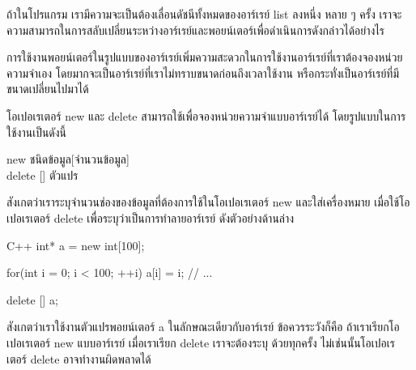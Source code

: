 \begin{quiz}{}
ถ้า{\wbr}ใน{\wbr}โปรแกรม เรา{\wbr}มี{\wbr}ความ{\wbr}จะ{\wbr}เป็น{\wbr}ต้อง{\wbr}เลื่อน{\wbr}ดัชนี{\wbr}ทั้งหมด{\wbr}ของ{\wbr}อาร์{\wbr}เรย์ {\ct list} ลง{\wbr}หนึ่ง{\wbr}
หลาย ๆ ครั้ง{\wbr}
เรา{\wbr}จะ{\wbr}ความ{\wbr}สามารถ{\wbr}ใน{\wbr}การ{\wbr}สลับ{\wbr}เปลี่ยน{\wbr}ระหว่าง{\wbr}อาร์{\wbr}เรย์{\wbr}และ{\wbr}พอยน์เตอร์{\wbr}เพื่อ{\wbr}ดำเนิน{\wbr}การ{\wbr}ดัง{\wbr}กล่าว{\wbr}ได้{\wbr}อย่างไร{\wbr}
\end{quiz}

การ{\wbr}ใช้งาน{\wbr}พอยน์เตอร์{\wbr}ใน{\wbr}รูปแบบ{\wbr}ของ{\wbr}อาร์{\wbr}เรย์{\wbr}เพิ่ม{\wbr}ความ{\wbr}สะดวก{\wbr}ใน{\wbr}การ{\wbr}ใช้งาน{\wbr}อาร์{\wbr}เรย์{\wbr}ที่{\wbr}เรา{\wbr}ต้อง{\wbr}จอง{\wbr}หน่วย{\wbr}ความ{\wbr}จำ{\wbr}เอง{\wbr}
โดย{\wbr}มาก{\wbr}จะ{\wbr}เป็น{\wbr}อาร์{\wbr}เรย์{\wbr}ที่{\wbr}เรา{\wbr}ไม่{\wbr}ทราบ{\wbr}ขนาด{\wbr}ก่อน{\wbr}ถึง{\wbr}เวลา{\wbr}ใช้งาน หรือ{\wbr}กระทั่ง{\wbr}เป็น{\wbr}อาร์{\wbr}เรย์{\wbr}ที่{\wbr}มี{\wbr}ขนาด{\wbr}เปลี่ยน{\wbr}ไป{\wbr}มา{\wbr}ได้{\wbr}

โอเปอเรเตอร์ {\ct new} และ {\ct delete}
สามารถ{\wbr}ใช้{\wbr}เพื่อ{\wbr}จอง{\wbr}หน่วย{\wbr}ความ{\wbr}จำ{\wbr}แบบ{\wbr}อาร์{\wbr}เรย์{\wbr}ได้ โดย{\wbr}รูปแบบ{\wbr}ใน{\wbr}การ{\wbr}ใช้งาน{\wbr}เป็น{\wbr}ดังนี้{\wbr}

\begin{center}
{\ct new} ชนิด{\wbr}ข้อมูล[จำนวน{\wbr}ข้อมูล] \\
{\ct delete []} ตัวแปร{\wbr}
\end{center}

สังเกต{\wbr}ว่า{\wbr}เรา{\wbr}ระบุ{\wbr}จำนวน{\wbr}ช่อง{\wbr}ของ{\wbr}ข้อมูล{\wbr}ที่{\wbr}ต้องการ{\wbr}ใช้{\wbr}ใน{\wbr}โอเปอเรเตอร์ {\ct new}
และ{\wbr}ใส่{\wbr}เครื่องหมาย {\ct []} เมื่อ{\wbr}ใช้{\wbr}โอเปอเรเตอร์ {\ct delete}
เพื่อ{\wbr}ระบุ{\wbr}ว่า{\wbr}เป็น{\wbr}การ{\wbr}ทำลาย{\wbr}อาร์{\wbr}เรย์ ดัง{\wbr}ตัวอย่าง{\wbr}ด้าน{\wbr}ล่าง{\wbr}

\latintext
\begin{codelist}{C++}{}
  int* a = new int[100];

  for(int i = 0; i < 100; ++i) 
    a[i] = i;
  // ...

  delete [] a;
\end{codelist}
\thaitext

สังเกต{\wbr}ว่า{\wbr}เรา{\wbr}ใช้งาน{\wbr}ตัวแปร{\wbr}พอยน์เตอร์ {\ct a} ใน{\wbr}ลักษณะ{\wbr}เดียว{\wbr}กับ{\wbr}อาร์{\wbr}เรย์ ข้อ{\wbr}ควร{\wbr}ระวัง{\wbr}ก็{\wbr}คือ{\wbr}
ถ้า{\wbr}เรา{\wbr}เรียก{\wbr}โอเปอเรเตอร์ {\ct new} แบบ{\wbr}อาร์{\wbr}เรย์ เมื่อ{\wbr}เรา{\wbr}เรียก {\ct delete}
เรา{\wbr}จะ{\wbr}ต้อง{\wbr}ระบุ {\ct []} ด้วย{\wbr}ทุก{\wbr}ครั้ง ไม่{\wbr}เช่น{\wbr}นั้น{\wbr}โอเปอเรเตอร์ delete
อาจ{\wbr}ทำงาน{\wbr}ผิดพลาด{\wbr}ได้{\wbr}

